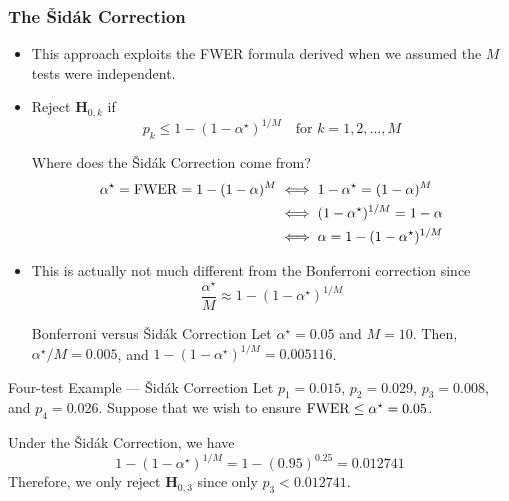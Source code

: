 \subsubsection*{The Šidák Correction}
\begin{itemize}
      \item This approach exploits the FWER formula derived when we assumed the $M$ tests were independent.
      \item Reject $ \mathbf{H}_{0,k} $ if
            \[ p_k\le 1-(1-\alpha^\star)^{1/M}\quad\text{for }k=1,2,\ldots,M \]
            \begin{Remark}{}{}
                  Where does the Šidák Correction come from?
                  \begin{align*}
                        \alpha^\star=\operatorname{FWER}=1-(1-\alpha)^M
                         & \iff 1-\alpha^\star = (1-\alpha)^M   \\
                         & \iff (1-\alpha^\star)^{1/M}=1-\alpha \\
                         & \iff \alpha=1-(1-\alpha^\star)^{1/M} \\
                  \end{align*}
            \end{Remark}
      \item This is actually not much different from the Bonferroni correction since
            \[ \frac{\alpha^\star}{M} \approx 1-(1-\alpha^\star)^{1/M} \]
            \begin{Example}{Bonferroni versus Šidák Correction}{}
                  Let $ \alpha^\star=0.05 $ and $ M=10 $. Then,
                  $ \alpha^\star/M=0.005$, and $1-(1-\alpha^\star)^{1/M}=0.005116$.
            \end{Example}
\end{itemize}
\begin{Example}{Four-test Example --- Šidák Correction}{}
      Let $ p_1=0.015 $, $ p_2=0.029 $, $ p_3=0.008 $, and $ p_4=0.026 $. Suppose that we wish to ensure
      $ \operatorname{FWER}\le \alpha^\star=0.05 $.

      \vspace{2mm}

      Under the Šidák Correction, we have
      \[ 1-(1-\alpha^\star)^{1/M}=1-(0.95)^{0.25}=0.012741 \]
      Therefore, we only reject $ \mathbf{H}_{0,3} $ since only $ p_3<0.012741 $.
\end{Example}
